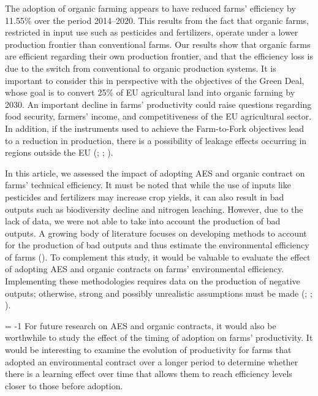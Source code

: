 \begin{Article}
\begin{refsection}[Lassalas]
The adoption of organic farming appears to have reduced farms'
efficiency by 11.55\% over the period 2014--2020. This results from the
fact that organic farms, restricted in input use such as pesticides and
fertilizers, operate under a lower production frontier than conventional
farms. Our results show that organic farms are efficient regarding their
own production frontier, and that the efficiency loss is due to the
switch from conventional to organic production systems. It is important
to consider this in perspective with the objectives of the Green Deal,
whose goal is to convert 25\% of EU agricultural land into organic
farming by 2030. An important decline in farms' productivity could raise
questions regarding food security, farmers' income, and competitiveness
of the EU agricultural sector. In addition, if the instruments used to
achieve the Farm-to-Fork objectives lead to a reduction in production,
there is a possibility of leakage effects occurring in regions outside
the EU (\textcite{arvanitopoulos2021}; \textcite{henning_witzke_2021}; \textcite{wesseler_2022}).

In this article, we assessed the impact of adopting AES and organic
contract on farms' technical efficiency. It must be noted that while the
use of inputs like pesticides and fertilizers may increase crop yields,
it can also result in bad outputs such as biodiversity decline and
nitrogen leaching. However, due to the lack of data, we were not able to
take into account the production of bad outputs. A growing body of
literature focuses on developing methods to account for the production
of bad outputs and thus estimate the environmental efficiency of farms
(\textcite{dakpo_jeanneaux_latruffe_2016}). To complement this study, it would be
valuable to evaluate the effect of adopting AES and organic contracts on
farms' environmental efficiency. Implementing these methodologies
requires data on the production of negative outputs; otherwise, strong
and possibly unrealistic assumptions must be made (\textcite{dakpo_lansink_2019}; \textcite{aitsidhoum2020}; \textcite{aitsidhoum2023}).

\looseness = -1
For future research on AES and organic contracts, it would also be
worthwhile to study the effect of the timing of adoption on farms'
productivity. It would be interesting to examine the evolution of
productivity for farms that adopted an environmental contract over a
longer period to determine whether there is a learning effect over time
that allows them to reach efficiency levels closer to those before
adoption.


\begingroup
\setlength{\emergencystretch}{3em}
\printbibliography
\endgroup
\end{refsection}

\end{Article}